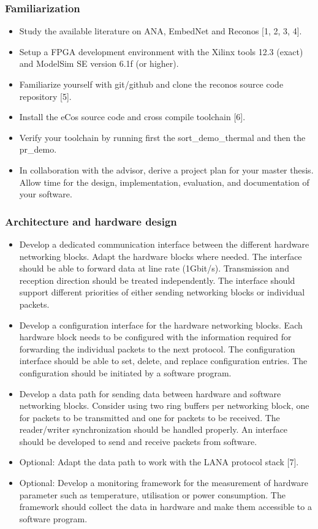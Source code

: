 \subsubsection{Familiarization}
\begin{itemize}
	\item Study the available literature on ANA, EmbedNet and Reconos [1, 2, 3, 4].
	\item Setup a FPGA development environment with the Xilinx tools 12.3 (exact) and ModelSim SE version 6.1f (or higher).
        \item Familiarize yourself with git/github and clone the reconos source code repository [5].
        \item Install the eCos source code and cross compile toolchain [6].
        \item Verify your toolchain by running first the sort\_demo\_thermal and then the pr\_demo.
	\item In collaboration with the advisor, derive a project plan for your master thesis. 
		Allow time for the design, implementation, evaluation, and documentation of your software.
\end{itemize}

\subsubsection{Architecture and hardware design}
\begin{itemize}
        \item Develop a dedicated communication interface between the different hardware networking blocks. Adapt the hardware blocks where needed. 
        The interface should be able to forward data at line rate (1Gbit/s). Transmission and reception direction should be treated independently. 
        The interface should support different priorities of either sending networking blocks or individual packets. 
        \item Develop a configuration interface for the hardware networking blocks. 
        Each hardware block needs to be configured with the information required for forwarding the individual packets to the next protocol. 
        The configuration interface should be able to set, delete, and replace configuration entries. The configuration should be initiated by a software program. 
        \item Develop a data path for sending data between hardware and software networking blocks. 
        Consider using two ring buffers per networking block, one for packets to be transmitted and one for packets to be received. 
        The reader/writer synchronization should be handled properly. An interface should be developed to send and receive packets from software.
        \item Optional: Adapt the data path to work with the LANA protocol stack [7].
        \item Optional: Develop a monitoring framework for the measurement of hardware parameter such as temperature, utilisation or power consumption. 
        The framework should collect the data in hardware and make them accessible to a software program.  
\end{itemize}

